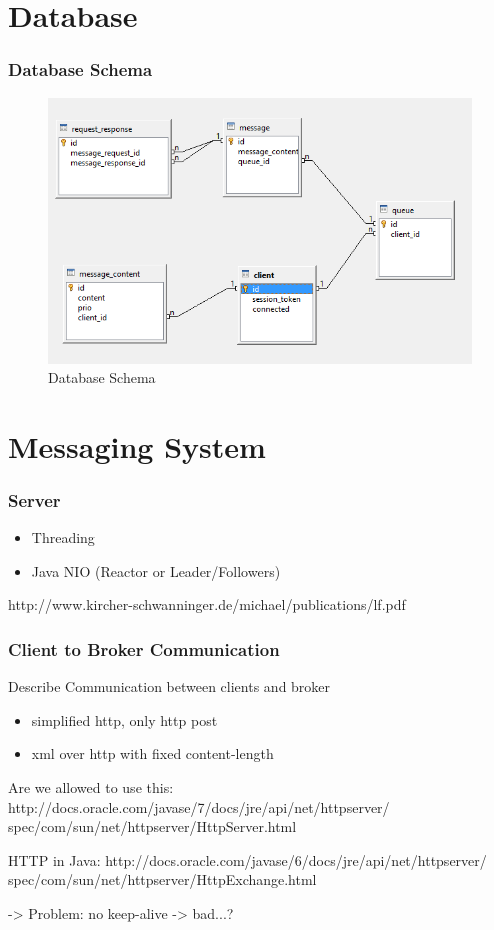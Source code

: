 \documentclass{beamer}
\begin{document}
\section{Database}
\begin{frame}
\frametitle{Database Schema}

\begin{figure}
  \begin{center}
    \includegraphics[scale=0.4]{../../database/db-schema.png}
  \end{center}
  \caption{Database Schema}
  \label{fig:db-schema}
\end{figure}



\end{frame}



\section{Messaging System}
\begin{frame}
\frametitle{Server}
\begin{itemize}
\item Threading
\item Java NIO (Reactor or Leader/Followers)
\end{itemize}
http://www.kircher-schwanninger.de/michael/publications/lf.pdf

\end{frame}

\begin{frame}
\frametitle{Client to Broker Communication}

Describe Communication between clients and broker
\begin{itemize}
\item simplified http, only http post
\item xml over http with fixed content-length
\end{itemize}

Are we allowed to use this:
http://docs.oracle.com/javase/7/docs/jre/api/net/httpserver/
spec/com/sun/net/httpserver/HttpServer.html

HTTP in Java:
http://docs.oracle.com/javase/6/docs/jre/api/net/httpserver/
spec/com/sun/net/httpserver/HttpExchange.html

-> Problem: no keep-alive -> bad...?

\end{frame}
\end{document}
